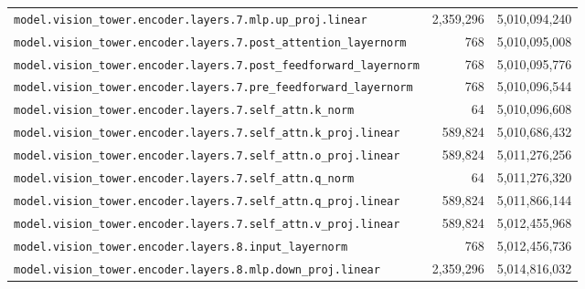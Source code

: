 \documentclass[10pt,a4paper]{article}
\theoremstyle{definition}
\begin{document}
\begin{appendices}
\begin{longtable}{p{9.5cm}rr}
\texttt{model.\allowbreak{}vision\_tower.\allowbreak{}encoder.\allowbreak{}layers.\allowbreak{}7.\allowbreak{}mlp.\allowbreak{}up\_proj.\allowbreak{}linear} & 2,359,296 & 5,010,094,240 \\
\texttt{model.\allowbreak{}vision\_tower.\allowbreak{}encoder.\allowbreak{}layers.\allowbreak{}7.\allowbreak{}post\_attention\_layernorm} & 768 & 5,010,095,008 \\
\texttt{model.\allowbreak{}vision\_tower.\allowbreak{}encoder.\allowbreak{}layers.\allowbreak{}7.\allowbreak{}post\_feedforward\_layernorm} & 768 & 5,010,095,776 \\
\texttt{model.\allowbreak{}vision\_tower.\allowbreak{}encoder.\allowbreak{}layers.\allowbreak{}7.\allowbreak{}pre\_feedforward\_layernorm} & 768 & 5,010,096,544 \\
\texttt{model.\allowbreak{}vision\_tower.\allowbreak{}encoder.\allowbreak{}layers.\allowbreak{}7.\allowbreak{}self\_attn.\allowbreak{}k\_norm} & 64 & 5,010,096,608 \\
\texttt{model.\allowbreak{}vision\_tower.\allowbreak{}encoder.\allowbreak{}layers.\allowbreak{}7.\allowbreak{}self\_attn.\allowbreak{}k\_proj.\allowbreak{}linear} & 589,824 & 5,010,686,432 \\
\texttt{model.\allowbreak{}vision\_tower.\allowbreak{}encoder.\allowbreak{}layers.\allowbreak{}7.\allowbreak{}self\_attn.\allowbreak{}o\_proj.\allowbreak{}linear} & 589,824 & 5,011,276,256 \\
\texttt{model.\allowbreak{}vision\_tower.\allowbreak{}encoder.\allowbreak{}layers.\allowbreak{}7.\allowbreak{}self\_attn.\allowbreak{}q\_norm} & 64 & 5,011,276,320 \\
\texttt{model.\allowbreak{}vision\_tower.\allowbreak{}encoder.\allowbreak{}layers.\allowbreak{}7.\allowbreak{}self\_attn.\allowbreak{}q\_proj.\allowbreak{}linear} & 589,824 & 5,011,866,144 \\
\texttt{model.\allowbreak{}vision\_tower.\allowbreak{}encoder.\allowbreak{}layers.\allowbreak{}7.\allowbreak{}self\_attn.\allowbreak{}v\_proj.\allowbreak{}linear} & 589,824 & 5,012,455,968 \\
\texttt{model.\allowbreak{}vision\_tower.\allowbreak{}encoder.\allowbreak{}layers.\allowbreak{}8.\allowbreak{}input\_layernorm} & 768 & 5,012,456,736 \\
\texttt{model.\allowbreak{}vision\_tower.\allowbreak{}encoder.\allowbreak{}layers.\allowbreak{}8.\allowbreak{}mlp.\allowbreak{}down\_proj.\allowbreak{}linear} & 2,359,296 & 5,014,816,032 \\

\end{longtable}
\end{appendices}
\end{document}
